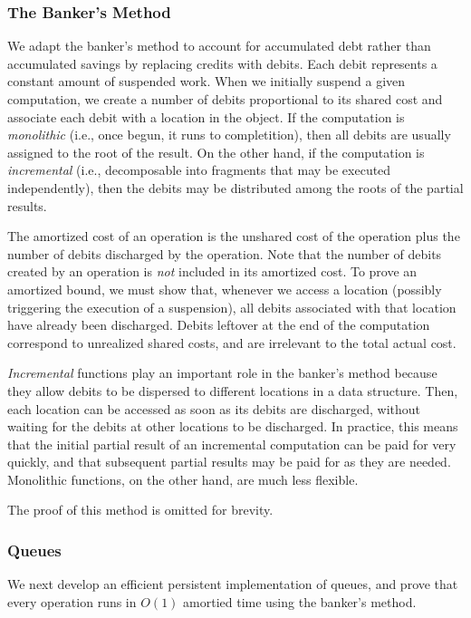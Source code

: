 \documentclass[12pt, a4paper]{article} %
\begin{document}
\subsubsection{The Banker's Method}%
\label{ssub:The Banker's Method}

We adapt the banker's method to account for accumulated debt rather than accumulated savings by replacing credits with debits. Each debit represents a constant amount of suspended work. When we initially suspend a given computation, we create a number of debits proportional to its shared cost and associate each debit with a location in the object. If the computation is \textit{monolithic} (i.e., once begun, it runs to completition), then all debits are usually assigned to the root of the result. On the other hand, if the computation is \textit{incremental} (i.e., decomposable into fragments that may be executed independently), then the debits may be distributed among the roots of the partial results.

The amortized cost of an operation is the unshared cost of the operation plus the number of debits discharged by the operation. Note that the number of debits created by an operation is \textit{not} included in its amortized cost. To prove an amortized bound, we must show that, whenever we access a location (possibly triggering the execution of a suspension), all debits associated with that location have already been discharged. Debits leftover at the end of the computation correspond to unrealized shared costs, and are irrelevant to the total actual cost.

\textit{Incremental} functions play an important role in the banker's method because they allow debits to be dispersed to different locations in a data structure. Then, each location can be accessed as soon as its debits are discharged, without waiting for the debits at other locations to be discharged. In practice, this means that the initial partial result of an incremental computation can be paid for very quickly, and that subsequent partial results may be paid for as they are needed. Monolithic functions, on the other hand, are much less flexible.

The proof of this method is omitted for brevity.

\subsubsection{Queues}%
\label{ssub:Queues}

We next develop an efficient persistent implementation of queues, and prove that every operation runs in $O(1)$ amortied time using the banker's method.
\end{document}
